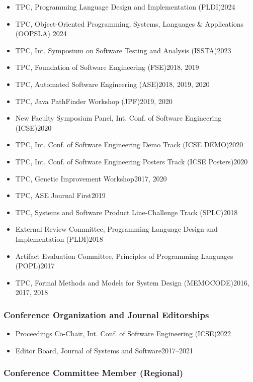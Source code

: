\documentclass[11pt]{article}
\begin{document}
\begin{itemize}
\item TPC, Programming Language Design and Implementation (PLDI)\hfill 2024  
\item TPC, Object-Oriented Programming, Systems, Languages \& Applications (OOPSLA) \hfill 2024
\item TPC,  Int. Symposium on Software Testing and Analysis (ISSTA)\hfill 2023
\item TPC, Foundation of Software Engineering (FSE)\hfill 2018, 2019 
\item TPC, Automated Software Engineering (ASE)\hfill 2018, 2019, 2020
\item TPC, Java PathFinder Workshop (JPF)\hfill 2019, 2020 
\item New Faculty Symposium Panel, Int. Conf. of Software Engineering (ICSE)\hfill 2020
\item TPC, Int. Conf. of Software Engineering Demo Track (ICSE DEMO)\hfill 2020
\item TPC, Int. Conf. of Software Engineering Posters Track (ICSE Posters)\hfill 2020
\item TPC, Genetic Improvement Workshop\hfill 2017, 2020 
\item TPC, ASE Journal First\hfill 2019
\item TPC, Systems and Software Product Line-Challenge Track (SPLC)\hfill 2018
\item External Review Committee, Programming Language Design and Implementation (PLDI)\hfill 2018
\item Artifact Evaluation Committee, Principles of Programming Languages (POPL)\hfill 2017
\item TPC, Formal Methods and Models for System Design (MEMOCODE)\hfill 2016, 2017, 2018
\end{itemize}

\subsubsection{Conference Organization and Journal Editorships}
\begin{itemize}
\item Proceedings Co-Chair,  Int. Conf. of Software Engineering (ICSE)\hfill 2022  
\item Editor Board, Journal of Systems and Software\hfill 2017--2021
\end{itemize}

\subsubsection{Conference Committee Member (Regional)}
\end{document}
